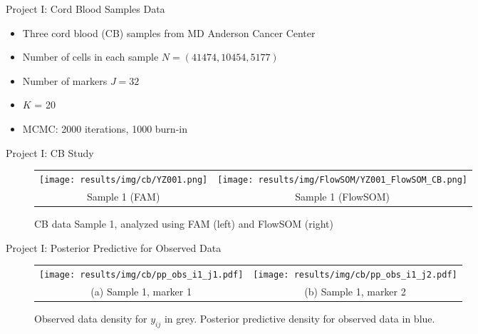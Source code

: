 \documentclass[ignorenonframetext,]{beamer}
\begin{document}
\begin{frame}{Project I: Cord Blood Samples Data}
  \begin{itemize}
    \setlength\itemsep{1em}
    \item Three cord blood (CB) samples from MD Anderson Cancer Center
    \item Number of cells in each sample $N = (41474,10454,5177)$
    \item Number of markers $J=32$
    \item $K$ = 20
    \item MCMC: 2000 iterations, 1000 burn-in
  \end{itemize}
\end{frame}

\begin{frame}{Project I: CB Study}
\vspace{-1em}\begin{figure}
  \begin{center}
  \begin{tabular}{cc}
  \texttt{[image: results/img/cb/YZ001.png]} &
  \texttt{[image: results/img/FlowSOM/YZ001\_FlowSOM\_CB.png]} \\
  {\small Sample 1 (FAM)} & {\small Sample 1 (FlowSOM)} \\
  \end{tabular}
  \end{center}
  \vspace{-0.05in}
  \caption{CB data Sample 1, analyzed using FAM (left) and FlowSOM (right)}
\end{figure}
\end{frame}

\begin{frame}{Project I: Posterior Predictive for Observed Data}
\vspace{-1em}\begin{figure}
  \begin{center}
  \begin{tabular}{cc}
  \texttt{[image: results/img/cb/pp\_obs\_i1\_j1.pdf]}&
  \texttt{[image: results/img/cb/pp\_obs\_i1\_j2.pdf]}\\
  {\small (a) Sample 1, marker 1} & {\small (b) Sample 1, marker 2} \\
  \end{tabular}
  \end{center}
  \vspace{-0.05in}
  \caption{Observed data density for $y_{ij}$ in grey. Posterior predictive density for observed data in blue.}
\end{figure}
\end{frame}
\end{document}
